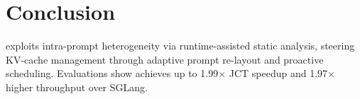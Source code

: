 \section{Conclusion}
\label{sec:conclusion}
\sysname exploits intra-prompt heterogeneity via runtime-assisted static analysis, steering KV-cache management through adaptive prompt re-layout and proactive scheduling. Evaluations show \sysname achieves up to 1.99$\times$ JCT speedup and 1.97$\times$ higher throughput over SGLang.